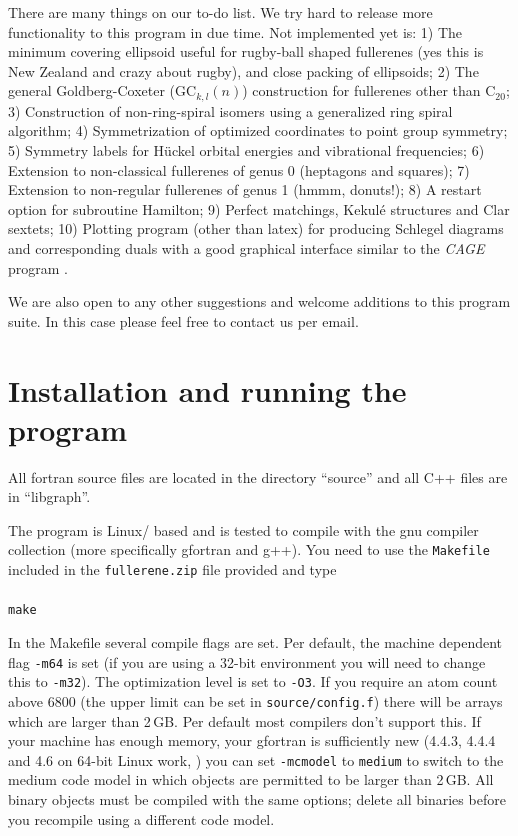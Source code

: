 \documentclass[article,a4paper,twoside]{memoir}
\let\acr=\textsmaller
\newcommand{\C}[1]{\ensuremath{\mathrm{C}_{#1}}}
\newcommand{\program}[1]{\textit{#1}}
\newcommand{\filename}[1]{\texttt{#1}}
\begin{document}
There are many things on our to-do list. We try hard to release more functionality to this program in due time.
Not implemented yet is: 
1) The minimum covering ellipsoid useful for  rugby-ball shaped fullerenes (yes this is New Zealand
and crazy about rugby), and close packing of ellipsoids; 
2) The general Goldberg-Coxeter (GC$_{k,l}(n)$) construction for fullerenes other than \C{20};
3) Construction of non-ring-spiral isomers using a generalized ring spiral algorithm; 
4) Symmetrization of optimized coordinates to point group symmetry; 
5) Symmetry labels for H\"uckel orbital energies and vibrational frequencies; 
6) Extension to non-classical fullerenes of genus 0 (heptagons and squares); 
7) Extension to non-regular fullerenes of genus 1 (hmmm, donuts!); 
8) A restart option for subroutine Hamilton;
9) Perfect matchings, Kekul\'e structures and Clar sextets;
10) Plotting program (other than latex) for producing Schlegel diagrams and corresponding duals
with a good graphical interface similar to the \program{CAGE} program \cite{Brinkmanx}.

We are also open to any other suggestions and welcome additions to this program suite. In this case please feel free to contact us per email.


\section{Installation and running the program}
All fortran source files are located in the directory ``source'' and all C++ files are in ``libgraph''.

The program is Linux/\acr{UNIX} based and is tested to compile with the gnu compiler collection (more specifically gfortran and g++).
You need to use the \filename{Makefile} included in the \filename{fullerene.zip} file provided and type\\\\
\verb|make|

In the Makefile several compile flags are set.  Per default, the machine dependent flag \verb|-m64| is set (if you are
using a 32-bit environment you will need to change this to \verb|-m32|).  The optimization level is set to \verb|-O3|.  
If you require an atom count above 6800 (the upper limit can be set in \filename{source/config.f}) there will be arrays which are larger
than 2\,GB.  Per default most compilers don't support this.  If your machine has enough memory, your gfortran is sufficiently new
(4.4.3, 4.4.4  and 4.6 on 64-bit Linux work, ) you can set \verb|-mcmodel| to \verb|medium| to switch to the medium code model in
which objects are permitted to be larger than 2\,GB.  All binary objects must be compiled with the same options; delete all
binaries before you recompile using a different code model. 
\end{document}
